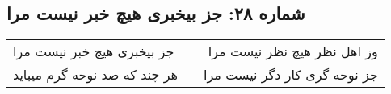 \begin{center}
\section*{شماره ۲۸: جز بیخبری هیچ خبر نیست مرا}
\label{sec:028}
\begin{longtable}{l p{0.5cm} r}
جز بیخبری هیچ خبر نیست مرا
&&
وز اهل نظر هیچ نظر نیست مرا
\\
هر چند که صد نوحه گرم میباید
&&
جز نوحه گری کار دگر نیست مرا
\\
\end{longtable}
\end{center}
